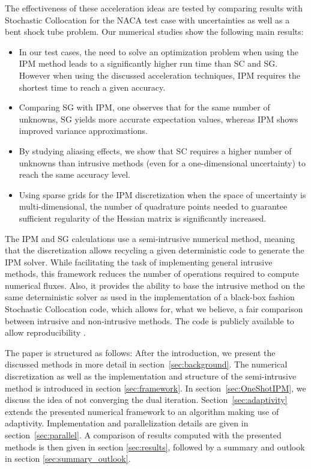 The effectiveness of these acceleration ideas are tested by comparing results with Stochastic Collocation for the NACA test case \cite{jacobs1933characteristics} with uncertainties as well as a bent shock tube problem. Our numerical studies show the following main results:
\begin{itemize}
\item In our test cases, the need to solve an optimization problem when using the IPM method leads to a significantly higher run time than SC and SG. However when using the discussed acceleration techniques, IPM requires the shortest time to reach a given accuracy.
\item Comparing SG with IPM, one observes that for the same number of unknowns, SG yields more accurate expectation values, whereas IPM shows improved variance approximations.
\item By studying aliasing effects, we show that SC requires a higher number of unknowns than intrusive methods (even for a one-dimensional uncertainty) to reach the same accuracy level.
\item Using sparse grids for the IPM discretization when the space of uncertainty is multi-dimensional, the number of quadrature points needed to guarantee sufficient regularity of the Hessian matrix is significantly increased.
\end{itemize}
The IPM and SG calculations use a semi-intrusive numerical method, meaning that the discretization allows recycling a given deterministic code to generate the IPM solver. While facilitating the task of implementing general intrusive methods, this framework reduces the number of operations required to compute numerical fluxes. Also, it provides the ability to base the intrusive method on the same deterministic solver as used in the implementation of a black-box fashion Stochastic Collocation code, which allows for, what we believe, a fair comparison between intrusive and non-intrusive methods. The code is publicly available to allow reproducibility \cite{uqcreator}.

The paper is structured as follows: After the introduction, we present the discussed methods in more detail in section~\ref{sec:background}. The numerical discretization as well as the implementation and structure of the semi-intrusive method is introduced in section \ref{sec:framework}. In section~\ref{sec:OneShotIPM}, we discuss the idea of not converging the dual iteration. Section~\ref{sec:adaptivity} extends the presented numerical framework to an algorithm making use of adaptivity. Implementation and parallelization details are given in section~\ref{sec:parallel}. A comparison of results computed with the presented methods is then given in section \ref{sec:results}, followed by a summary and outlook in section \ref{sec:summary_outlook}.


